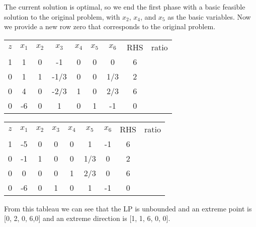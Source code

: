 The current solution is optimal, so we end the first phase with a basic feasible solution to the original problem, with $x_2$, $x_4$, and $x_5$ as the basic variables.  Now we provide a new row zero that corresponds to the original problem.

\begin{center} \begin{tabular} {|c|c|c|c|c|c|c||c| r} \cline{1-8}
$z$	& $x_1$	& $x_2$	& $x_3$	& $x_4$	& $x_5$	& $x_6$	&  RHS & ratio \\ \cline{1-8}
1	&	  1 &	  0 &	 -1 &	  0 &	  0 &	  0 &   6 & \\
0	&	  1 &	  1 &	-1/3 &	  0 &	  0 &	  1/3 &	 2 &   \\
0	&	  4 &	  0 &	-2/3 &	  1 &	  0 &	  2/3 &	 6 &  \\
0	&	 -6 &	  0 &	 1 &	  0 &	  1 &	  -1 &	 0 &  \\ \cline{1-8}
\end{tabular} \end{center}

\begin{center} \begin{tabular} {|c|c|c|c|c|c|c||c| r} \cline{1-8}
$z$	& $x_1$	& $x_2$	& $x_3$	& $x_4$	& $x_5$	& $x_6$	&  RHS & ratio \\ \cline{1-8}
1	&	 -5 &	  0 &	  0 &	  0 &	  1 &	  -1 &   6 & \\
0	&	 -1 &	  1 &	  0 &	  0 &	1/3 &	  0 &	 2 &   \\
0	&	  0 &	  0 &	  0 &	  1 &	2/3 &	  0 &	 6 &  \\
0	&	 -6 &	  0 &	  1 &	  0 &	  1 &	  -1 &	 0 &  \\ \cline{1-8}
\end{tabular} \end{center}
From this tableau we can see that the LP is unbounded and an extreme point is [0, 2, 0, 6,0] and an extreme direction is [1, 1, 6, 0, 0].




